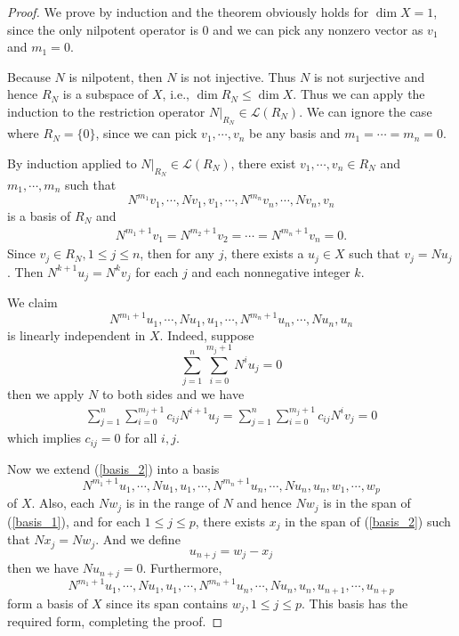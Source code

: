 \documentclass[11pt]{book}
\theoremstyle{definition}
\numberwithin{equation}{subsection}
\begin{document}
\begin{proof}
We prove by induction and the theorem obviously holds for $\dim X = 1$, since the only nilpotent operator is $0$ and we can pick any nonzero vector as $v_1$ and $m_1 = 0$. 

Because $N$ is nilpotent, then $N$ is not injective. Thus $N$ is not surjective and hence $R_N$ is a subspace of $X$, i.e., $\dim R_N \leq \dim X$. Thus we can apply the induction to the restriction operator $N|_{R_N}\in\mathcal{L}(R_N)$. We can ignore the case where $R_N = \{0\}$, since we can pick $v_1,\cdots,v_n$ be any basis and $m_1 = \cdots = m_n = 0$. 

By induction applied to $N|_{R_N}\in\mathcal{L}(R_N)$, there exist $v_1,\cdots,v_n\in R_N$ and $m_1,\cdots,m_n$ such that 
\begin{equation}\label{basis_1}
    N^{m_1}v_1, \cdots, Nv_1, v_1, \cdots, N^{m_n}v_n, \cdots, N v_n, v_n
\end{equation}
is a basis of $R_N$ and 
\begin{align*}
    N^{m_1+1}v_1 = N^{m_2+1}v_2 = \cdots = N^{m_n+1}v_n = 0.
\end{align*}
Since $v_j\in R_N, 1\leq j \leq n$, then for any $j$, there exists a $u_j\in X$ such that $v_j = Nu_j$. Then $N^{k+1}u_j = N^k v_j$ for each $j$ and each nonnegative integer $k$. 

We claim 
\begin{equation}\label{basis_2}
    N^{m_1+1}u_1, \cdots, Nu_1, u_1, \cdots, N^{m_n+1}u_n, \cdots, N u_n, u_n
\end{equation}
is linearly independent in $X$. Indeed, suppose $$\sum^n_{j=1}\sum^{m_j+1}_{i=0}N^{i}u_j = 0$$
then we apply $N$ to both sides and we have
\begin{align*}
    \sum^n_{j=1}\sum^{m_j+1}_{i=0}c_{ij}N^{i+1}u_j = \sum^n_{j=1}\sum^{m_j+1}_{i=0}c_{ij}N^{i}v_j = 0
\end{align*}
which implies $c_{ij} = 0$ for all $i,j$.

Now we extend (\ref{basis_2}) into a basis 
\begin{equation}\label{basis_3}
    N^{m_1+1}u_1, \cdots, Nu_1, u_1, \cdots, N^{m_n+1}u_n, \cdots, N u_n, u_n, w_1,\cdots, w_p
\end{equation}
of $X$. Also, each $Nw_j$ is in the range of $N$ and hence $Nw_j$ is in the span of (\ref{basis_1}), and for each $1\leq j\leq p$, there exists $x_j$ in the span of (\ref{basis_2}) such that $Nx_j = Nw_j$. And we define 
$$u_{n+j} = w_j - x_j$$
then we have $Nu_{n+j} = 0$. Furthermore, 
\begin{equation}\label{basis_4}
    N^{m_1+1}u_1, \cdots, Nu_1, u_1, \cdots, N^{m_n+1}u_n, \cdots, N u_n, u_n, u_{n+1},\cdots, u_{n+p}
\end{equation}
form a basis of $X$ since its span contains $w_j, 1\leq j\leq p$. This basis has the required form, completing the proof.
\end{proof}
\end{document}
